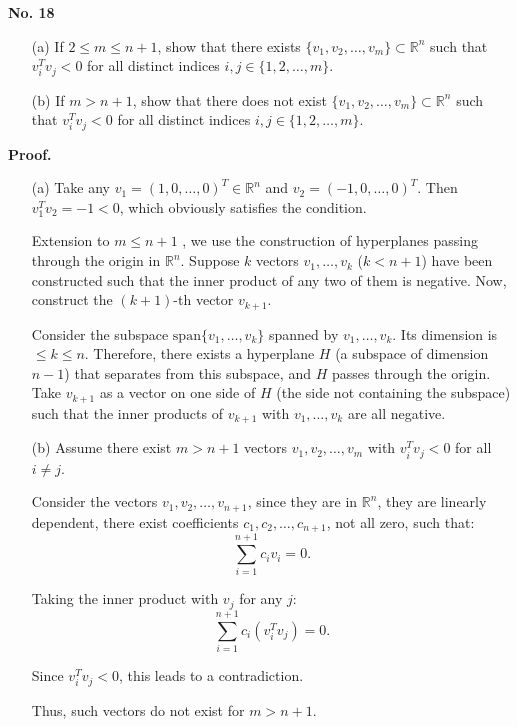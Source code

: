 \documentclass[a4paper, 11pt]{article}
\newenvironment{problem}[2][No.]
    { \begin{mdframed}[backgroundcolor=gray!5] \textbf{#1 #2} \\}
    {  \end{mdframed}}
\newenvironment{solution}
    {\textbf{Proof.}}
    {}
\begin{document}
\begin{problem}{18}
	\begin{enumerate}
		\item[(a)] If \( 2 \leq m \leq n + 1 \), show that there exists \( \{ v_1, v_2, \ldots, v_m \} \subset \mathbb{R}^n \) such that \( v_i^T v_j < 0 \) for all distinct indices \( i, j \in \{ 1, 2, \ldots, m \} \).
		\item[(b)] If \( m > n + 1 \), show that there does not exist \( \{ v_1, v_2, \ldots, v_m \} \subset \mathbb{R}^n \) such that \( v_i^T v_j < 0 \) for all distinct indices \( i, j \in \{ 1, 2, \ldots, m \} \).
	\end{enumerate}
\end{problem}

\begin{solution}
	\begin{enumerate}
	\item[(a)] 
	Take any \( v_1 = (1, 0, \dots, 0)^T \in \mathbb{R}^n \) and \( v_2 = (-1, 0, \dots, 0)^T \). Then \( v_1^T v_2 = -1 < 0 \), which obviously satisfies the condition. 
	
	Extension to \( m \leq n + 1 \) , we use the construction of hyperplanes passing through the origin in \( \mathbb{R}^n \). Suppose \( k \) vectors \( v_1, \dots, v_k \) (\( k < n + 1 \)) have been constructed such that the inner product of any two of them is negative. Now, construct the \( (k + 1) \)-th vector \( v_{k + 1} \).  
	
	Consider the subspace \( \text{span}\{v_1, \dots, v_k\} \) spanned by \( v_1, \dots, v_k \). Its dimension is \( \leq k \leq n \). Therefore, there exists a hyperplane \( H \) (a subspace of dimension \( n - 1 \)) that separates from this subspace, and \( H \) passes through the origin. Take \( v_{k + 1} \) as a vector on one side of \( H \) (the side not containing the subspace) such that the inner products of \( v_{k + 1} \) with \( v_1, \dots, v_k \) are all negative.  
	
	\item[(b)] 
	Assume there exist \( m > n + 1 \) vectors \( v_1, v_2, \ldots, v_m \) with \( v_i^T v_j < 0 \) for all \( i \neq j \). 
	
	Consider the vectors \( v_1, v_2, \ldots, v_{n+1} \), since they are in \(\mathbb{R}^n\), they are linearly dependent, there exist coefficients \( c_1, c_2, \ldots, c_{n+1} \), not all zero, such that:
	$$
	\sum_{i=1}^{n+1} c_i v_i = 0.
	$$
	
	Taking the inner product with \( v_j \) for any \( j \):
	$$
	\sum_{i=1}^{n+1} c_i (v_i^T v_j) = 0.
	$$
	
	Since \( v_i^T v_j < 0 \), this leads to a contradiction. 
	
	Thus, such vectors do not exist for \( m > n + 1 \).
		\end{enumerate}
\end{solution}
\end{document}
